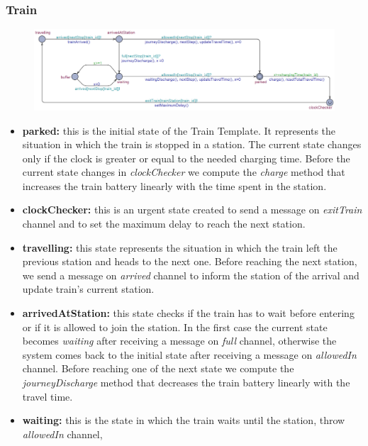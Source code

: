 \subsubsection{Train}
\begin{figure}[H]
    \centering
    \includegraphics[scale=0.45]{images/trainTemplate.png}
\end{figure}

\begin{itemize}
    \item \textbf{parked: }this is the initial state of the Train Template. It represents the situation in which the train is
            stopped in a station. The current state changes only if the clock is greater or equal to the needed charging time.
            Before the current state changes in \emph{clockChecker} we compute the \emph{charge} method that increases the
            train battery linearly with the time spent in the station.
    \item \textbf{clockChecker: }this is an urgent state created to send a message on \emph{exitTrain} channel and to set
            the maximum delay to reach the next station.
    \item \textbf{travelling: }this state represents the situation in which the train left the previous station and heads to
            the next one. Before reaching the next station, we send a message on \emph{arrived} channel to inform the station
            of the arrival and update train's current station.
    \item \textbf{arrivedAtStation: }this state checks if the train has to wait before entering or if it is allowed to join 
            the station. In the first case the current state becomes \emph{waiting} after receiving a message on \emph{full}
            channel, otherwise the system comes back to the initial state after receiving a message on \emph{allowedIn} channel.
            Before reaching one of the next state we compute the \textit{journeyDischarge} method that decreases
            the train battery linearly with the travel time.
    \item \textbf{waiting: }this is the state in which the train waits until the station, throw \emph{allowedIn} channel,

\end{itemize}
